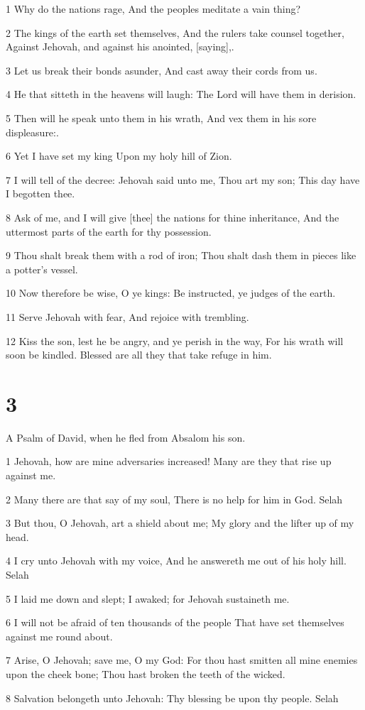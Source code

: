 \par 1 Why do the nations rage, And the peoples meditate a vain thing?
\par 2 The kings of the earth set themselves, And the rulers take counsel together, Against Jehovah, and against his anointed, [saying],.
\par 3 Let us break their bonds asunder, And cast away their cords from us.
\par 4 He that sitteth in the heavens will laugh: The Lord will have them in derision.
\par 5 Then will he speak unto them in his wrath, And vex them in his sore displeasure:.
\par 6 Yet I have set my king Upon my holy hill of Zion.
\par 7 I will tell of the decree: Jehovah said unto me, Thou art my son; This day have I begotten thee.
\par 8 Ask of me, and I will give [thee] the nations for thine inheritance, And the uttermost parts of the earth for thy possession.
\par 9 Thou shalt break them with a rod of iron; Thou shalt dash them in pieces like a potter's vessel.
\par 10 Now therefore be wise, O ye kings: Be instructed, ye judges of the earth.
\par 11 Serve Jehovah with fear, And rejoice with trembling.
\par 12 Kiss the son, lest he be angry, and ye perish in the way, For his wrath will soon be kindled. Blessed are all they that take refuge in him.

\chapter{3}

\par A Psalm of David, when he fled from Absalom his son.

\par 1 Jehovah, how are mine adversaries increased! Many are they that rise up against me.
\par 2 Many there are that say of my soul, There is no help for him in God. Selah
\par 3 But thou, O Jehovah, art a shield about me; My glory and the lifter up of my head.
\par 4 I cry unto Jehovah with my voice, And he answereth me out of his holy hill. Selah
\par 5 I laid me down and slept; I awaked; for Jehovah sustaineth me.
\par 6 I will not be afraid of ten thousands of the people That have set themselves against me round about.
\par 7 Arise, O Jehovah; save me, O my God: For thou hast smitten all mine enemies upon the cheek bone; Thou hast broken the teeth of the wicked.
\par 8 Salvation belongeth unto Jehovah: Thy blessing be upon thy people. Selah

